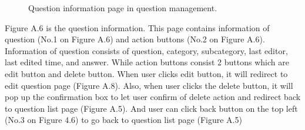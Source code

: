 \documentclass[12pt,oneside,openright,a4paper]{cpe-english-project}
\begin{document}
\begin{figure}[!h]\centering
{}
\caption{Question information page in question management.
}\label{fig:Question information page in question management.
}
\end{figure}

Figure A.6 is the question information. This page contains information of question 
(No.1 on Figure A.6) and action buttons (No.2 on Figure A.6).
Information of question consists of question, category, subcategory, last editor, last 
edited time, and answer. While action buttons consist 2 buttons which are edit button and 
delete button. When user clicks edit button, it will redirect to edit question page (Figure A.8). 
Also, when user clicks the delete button, it will pop up the confirmation box to let user 
confirm of delete action and redirect back to question list page (Figure A.5). And user can 
click back button on the top left (No.3 on Figure 4.6) to go back to question list page (Figure 
A.5)
\end{document}
